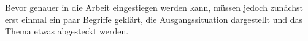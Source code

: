 Bevor genauer in die Arbeit eingestiegen werden kann, müssen jedoch zunächst erst einmal ein paar Begriffe geklärt, die Ausgangssituation dargestellt und das Thema etwas abgesteckt werden.










